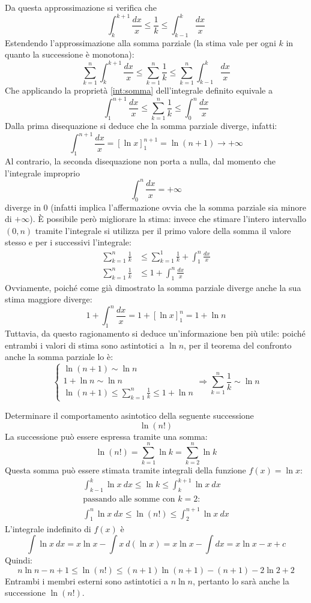 Da questa approssimazione si verifica che
\[
	\int_k^{k+1} \frac{dx}{x}\leq \frac{1}{k}\leq \int_{k-1}^k \frac{dx}{x}
\]
Estendendo l'approssimazione alla somma parziale (la stima vale per ogni $k$ in quanto la successione è monotona):
\[
	\sum_{k=1}^n \int_k^{k+1} \frac{dx}{x}\leq \sum_{k=1}^n \frac{1}{k}\leq \sum_{k=1}^n \int_{k-1}^k \frac{dx}{x}
\]
Che applicando la proprietà \ref{int:somma} dell'integrale definito equivale a
\[
	\int_1^{n+1}\frac{dx}{x}\leq \sum_{k=1}^n \frac{1}{k} \leq \int_0^n\frac{dx}{x}
\]
Dalla prima disequazione si deduce che la somma parziale diverge, infatti:
\[
	\int_1^{n+1}\frac{dx}{x}=[\ln x]_1^{n+1}=\ln (n+1)\to+\infty
\]
Al contrario, la seconda disequazione non porta a nulla, dal momento che l'integrale improprio
\[
	\int_0^n\frac{dx}{x}=+\infty
\]
diverge in $0$ (infatti implica l'affermazione ovvia che la somma parziale sia minore di $+\infty$). È possibile però migliorare la stima: invece che stimare l'intero intervallo $(0,n)$ tramite l'integrale si utilizza per il primo valore della somma il valore stesso e per i successivi l'integrale:
\begin{align*}
	\sum_{k=1}^n \frac{1}{k} & \leq \sum_{k=1}^1 \frac{1}{k}+\int_1^n\frac{dx}{x} \\
	\sum_{k=1}^n \frac{1}{k} & \leq 1+\int_1^n\frac{dx}{x}
\end{align*}
Ovviamente, poiché come già dimostrato la somma parziale diverge anche la sua stima maggiore diverge:
\[
	1+\int_1^n\frac{dx}{x}=1+[\ln x]_1^n=1+\ln n
\]
Tuttavia, da questo ragionamento si deduce un'informazione ben più utile: poiché entrambi i valori di stima sono astintotici a $\ln n$, per il teorema del confronto anche la somma parziale lo è:
\[
	\begin{cases}
		\ln(n+1)\sim \ln n \\
		1+\ln n\sim \ln n  \\
		\ln(n+1)\leq\sum_{k=1}^n \frac{1}{k}\leq 1+\ln n
	\end{cases}\Rightarrow
	\sum_{k=1}^n \frac{1}{k}\sim \ln n
\]

\begin{examp}
	Determinare il comportamento asintotico della seguente successione
	\[
		\ln(n!)
	\]
	La successione può essere espressa tramite una somma:
	\[
		\ln(n!)=\sum_{k=1}^n \ln k=\sum_{k=2}^n \ln k
	\]
	Questa somma può essere stimata tramite integrali della funzione $f(x)=\ln x$:
	\begin{gather*}
		\int_{k-1}^k \ln x ~dx\leq \ln k \leq \int_k^{k+1} \ln x ~dx\\
		\text{passando alle somme con $k=2$:}\\
		\int_1^n \ln x ~dx\leq \ln(n!) \leq \int_2^{n+1} \ln x ~dx
	\end{gather*}
	L'integrale indefinito di $f(x)$ è
	\[
		\int \ln x ~dx=x\ln x -\int x ~d(\ln x)=x\ln x -\int dx=x\ln x -x +c
	\]
	Quindi:
	\[
		n \ln n -n+1 \leq \ln(n!) \leq (n+1)\ln(n+1)-(n+1)-2\ln 2+2
	\]
	Entrambi i membri esterni sono astintotici a $n\ln n$, pertanto lo sarà anche la successione $\ln(n!)$.
\end{examp}

